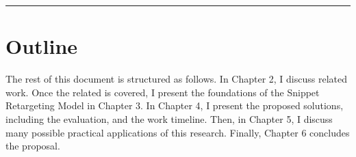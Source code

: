 \fancybreak{\pfbreakdisplay}

\section{Outline}
\label{sec:outline}

The rest of this document is structured as follows. In Chapter 2, I discuss related work.
Once the related is covered, I present the foundations of the Snippet Retargeting Model in Chapter 3. In Chapter 4, I present the proposed solutions, including the evaluation, and the work timeline. Then, in Chapter 5, I discuss many possible practical applications of this research. Finally, Chapter 6 concludes the proposal.